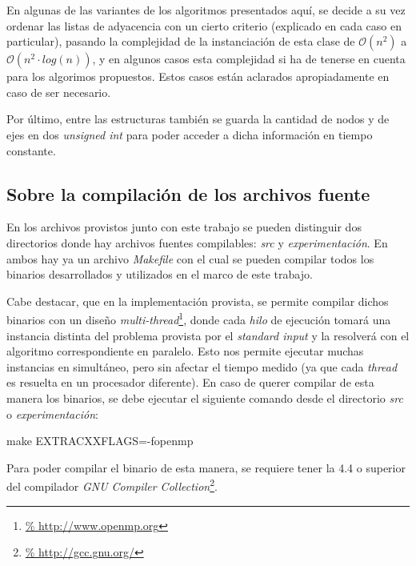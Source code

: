 \par En algunas de las variantes de los algoritmos presentados aqu\'i, se decide
    a su vez ordenar las listas de adyacencia con un cierto criterio (explicado
    en cada caso en particular), pasando la complejidad de la instanciaci\'on
    de esta clase de $\mathcal O(n^2)$ a $\mathcal O(n^2 \cdot log(n))$, y
    en algunos casos esta complejidad si ha de tenerse en cuenta para los algorimos
    propuestos. Estos casos est\'an aclarados apropiadamente en caso de ser
    necesario.

\par Por \'ultimo, entre las estructuras tambi\'en se guarda la cantidad
    de nodos y de ejes en dos \emph{unsigned int} para poder acceder a dicha
    informaci\'on en tiempo constante.

{}
\subsection*{Sobre la compilaci\'on de los archivos fuente}
\par En los archivos provistos junto con este trabajo se pueden distinguir dos
    directorios donde hay archivos fuentes compilables: \emph{src} y
    \emph{experimentaci\'on}. En ambos hay ya un archivo \emph{Makefile} con el
    cual se pueden compilar todos los binarios desarrollados y utilizados en
    el marco de este trabajo.

\par Cabe destacar, que en la implementaci\'on provista, se permite compilar
    dichos binarios con un dise\~no \emph{multi-thread}\footnote{\url{%
    http://www.openmp.org}}, donde cada \emph{hilo} de ejecuci\'on tomar\'a
    una instancia distinta del problema provista por el \emph{standard input}
    y la resolver\'a con el algoritmo correspondiente en paralelo. Esto nos
    permite ejecutar muchas instancias en simult\'aneo, pero sin afectar
    el tiempo medido (ya que cada \emph{thread} es resuelta en un procesador
    diferente). En caso de querer compilar de esta manera los binarios, se
    debe ejecutar el siguiente comando desde el directorio \emph{src} o
    \emph{experimentaci\'on}:

\bigskip
\par make EXTRACXXFLAGS=-fopenmp
\bigskip

\par Para poder compilar el binario de esta manera, se requiere tener la 4.4
    o superior del compilador \emph{GNU Compiler Collection}\footnote{\url{%
    http://gcc.gnu.org/}}.

